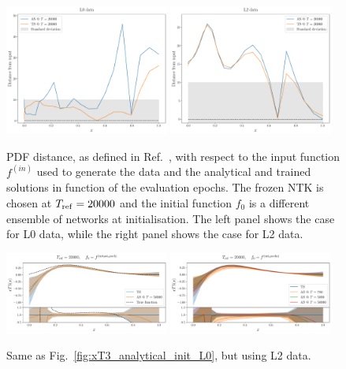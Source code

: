   \begin{figure}[ht!]
    \centering
    \includegraphics[width=0.48\textwidth]{plots/analytical_solution/distance_plot_from_fin_L0.pdf}
    \includegraphics[width=0.48\textwidth]{plots/analytical_solution/distance_plot_from_fin_L2.pdf}
    \caption{PDF distance, as defined in Ref.~\cite{NNPDF:2021njg}, with respect to
    the input function $f^{(in)}$ used to generate the data and the analytical and trained
    solutions in function of the evaluation epochs. The frozen NTK
    is chosen at $T_{\rm ref} = 20000$ and the initial function $f_0$ is a different
    ensemble of networks at initialisation. The left panel shows the case for L0 data,
    while the right panel shows the case for L2 data.}
    \label{fig:xT3_distance_L0_L2}
  \end{figure}

\begin{figure}[ht!]
    \centering
    \includegraphics[width=0.48\textwidth]{plots/analytical_solution/pdf_plot_init_last_epoch_L2.pdf}
    \includegraphics[width=0.48\textwidth]{plots/analytical_solution/pdf_plot_init_epochs_L2.pdf}
    \caption{Same as Fig.~\ref{fig:xT3_analytical_init_L0}, but using L2 data.}
    \label{fig:xT3_analytical_init_L2}
  \end{figure}


